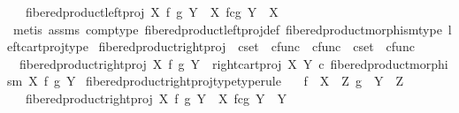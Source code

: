 \begin{isabellebody}
\ \ \ {\isachardoublequoteopen}fibered{\isacharunderscore}{\kern0pt}product{\isacharunderscore}{\kern0pt}left{\isacharunderscore}{\kern0pt}proj\ X\ f\ g\ Y\ {\isacharcolon}{\kern0pt}\ X\ \isactrlbsub f\isactrlesub {\isasymtimes}\isactrlsub c\isactrlbsub g\isactrlesub \ Y\ {\isasymrightarrow}\ X{\isachardoublequoteclose}\isanewline
%
\isadelimproof
\ \ %
\endisadelimproof
%
\isatagproof
{}\isamarkupfalse%
\ {\isacharparenleft}{\kern0pt}metis\ assms\ comp{\isacharunderscore}{\kern0pt}type\ fibered{\isacharunderscore}{\kern0pt}product{\isacharunderscore}{\kern0pt}left{\isacharunderscore}{\kern0pt}proj{\isacharunderscore}{\kern0pt}def\ fibered{\isacharunderscore}{\kern0pt}product{\isacharunderscore}{\kern0pt}morphism{\isacharunderscore}{\kern0pt}type\ left{\isacharunderscore}{\kern0pt}cart{\isacharunderscore}{\kern0pt}proj{\isacharunderscore}{\kern0pt}type{\isacharparenright}{\kern0pt}%
\endisatagproof
{\isafoldproof}%
%
\isadelimproof
\isanewline
%
\endisadelimproof
\isanewline
{}\isamarkupfalse%
\ fibered{\isacharunderscore}{\kern0pt}product{\isacharunderscore}{\kern0pt}right{\isacharunderscore}{\kern0pt}proj\ {\isacharcolon}{\kern0pt}{\isacharcolon}{\kern0pt}\ {\isachardoublequoteopen}cset\ {\isasymRightarrow}\ cfunc\ {\isasymRightarrow}\ cfunc\ {\isasymRightarrow}\ cset\ {\isasymRightarrow}\ cfunc{\isachardoublequoteclose}\ \isanewline
\ \ {\isachardoublequoteopen}fibered{\isacharunderscore}{\kern0pt}product{\isacharunderscore}{\kern0pt}right{\isacharunderscore}{\kern0pt}proj\ X\ f\ g\ Y\ {\isacharequal}{\kern0pt}\ {\isacharparenleft}{\kern0pt}right{\isacharunderscore}{\kern0pt}cart{\isacharunderscore}{\kern0pt}proj\ X\ Y{\isacharparenright}{\kern0pt}\ {\isasymcirc}\isactrlsub c\ {\isacharparenleft}{\kern0pt}fibered{\isacharunderscore}{\kern0pt}product{\isacharunderscore}{\kern0pt}morphism\ X\ f\ g\ Y{\isacharparenright}{\kern0pt}{\isachardoublequoteclose}\isanewline
\isanewline
{}\isamarkupfalse%
\ fibered{\isacharunderscore}{\kern0pt}product{\isacharunderscore}{\kern0pt}right{\isacharunderscore}{\kern0pt}proj{\isacharunderscore}{\kern0pt}type{\isacharbrackleft}{\kern0pt}type{\isacharunderscore}{\kern0pt}rule{\isacharbrackright}{\kern0pt}{\isacharcolon}{\kern0pt}\isanewline
\ \ \ {\isachardoublequoteopen}f\ {\isacharcolon}{\kern0pt}\ X\ {\isasymrightarrow}\ Z{\isachardoublequoteclose}\ {\isachardoublequoteopen}g\ {\isacharcolon}{\kern0pt}\ Y\ {\isasymrightarrow}\ Z{\isachardoublequoteclose}\isanewline
\ \ \ {\isachardoublequoteopen}fibered{\isacharunderscore}{\kern0pt}product{\isacharunderscore}{\kern0pt}right{\isacharunderscore}{\kern0pt}proj\ X\ f\ g\ Y\ {\isacharcolon}{\kern0pt}\ X\ \isactrlbsub f\isactrlesub {\isasymtimes}\isactrlsub c\isactrlbsub g\isactrlesub \ Y\ {\isasymrightarrow}\ Y{\isachardoublequoteclose}\isanewline

\end{isabellebody}
